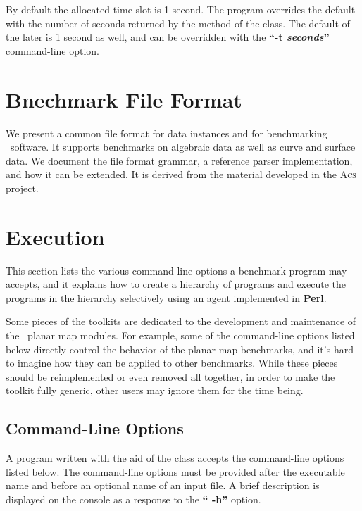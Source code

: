 By default the allocated time slot is 1 second. The program overrides the
default with the number of seconds returned by the
 method of the
 class. The default of the later is
1 second as well, and can be overridden with the \textbf{``-t {\em seconds}''}
command-line option.


\section{Bnechmark File Format}
We present a common file format for data instances and for benchmarking 
\cgal\ software. It supports benchmarks on algebraic data as well as curve 
and surface data. We document the file format grammar, a reference parser 
implementation, and how it can be extended.
It is derived from the material developed in the \textsc{Acs} project.







\section{Execution}
This section lists the various command-line options a benchmark
program may accepts, and it explains how to create a hierarchy of
programs and execute the programs in the hierarchy selectively using
an agent implemented in \textbf{Perl}.

Some pieces of the toolkits are dedicated to the development and
maintenance of the \cgal\ planar map modules. For example, some of
the command-line options listed below directly control the behavior
of the planar-map benchmarks, and it's hard to imagine how they can be
applied to other benchmarks. While these pieces should be
reimplemented or even removed all together, in order to make the
toolkit fully generic, other users may ignore them for the time being.

\subsection{Command-Line Options}
A program written with the aid of the 
class accepts the command-line options listed below. The command-line options
must be provided after the executable name and before an optional name of an
input file. A brief description is displayed on the console as a
response to the \textbf{`` -h''} option.

